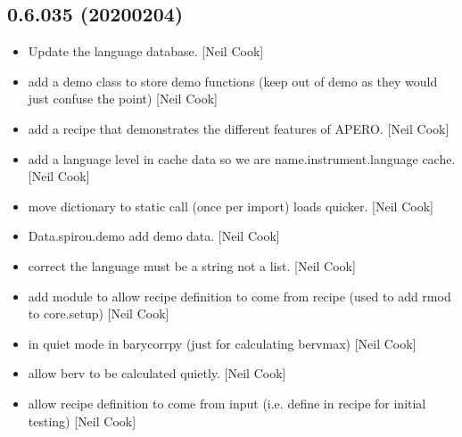 \documentclass[a4paper,10pt,english]{report}
\begin{document}
\subsection{0.6.035 (2020\sphinxhyphen{}02\sphinxhyphen{}04)}
\label{\detokenize{misc/changelog:id2}}\begin{itemize}
\item {} 
Update the language database. {[}Neil Cook{]}

\item {} 
 \sphinxhyphen{} add a demo class to store demo
functions (keep out of demo as they would just confuse the point)
{[}Neil Cook{]}

\item {} 
 \sphinxhyphen{} add a recipe that demonstrates the
different features of APERO. {[}Neil Cook{]}

\item {} 
 \sphinxhyphen{} add a language level in cache data so we are
name.instrument.language cache. {[}Neil Cook{]}

\item {} 
 \sphinxhyphen{} move dictionary to static call (once per
import) \textendash{} loads quicker. {[}Neil Cook{]}

\item {} 
Data.spirou.demo \sphinxhyphen{} add demo data. {[}Neil Cook{]}

\item {} 
 \sphinxhyphen{} correct the language must be a string not a
list. {[}Neil Cook{]}

\item {} 
 \sphinxhyphen{} add module to allow recipe definition to come
from recipe (used to add rmod to core.setup) {[}Neil Cook{]}

\item {} 
 \sphinxhyphen{}  in quiet mode in barycorrpy (just
for calculating bervmax) {[}Neil Cook{]}

\item {} 
 \sphinxhyphen{} allow berv to be calculated quietly. {[}Neil
Cook{]}

\item {} 
 \sphinxhyphen{} allow recipe definition to come from input
(i.e. define in recipe \sphinxhyphen{} for initial testing) {[}Neil Cook{]}


\end{itemize}
\end{document}
